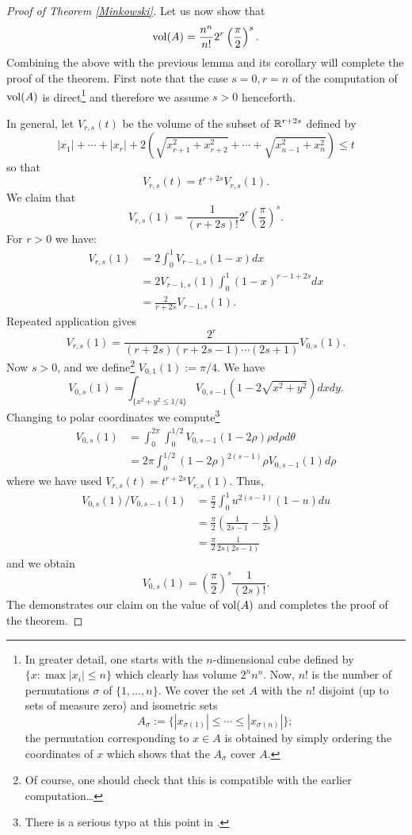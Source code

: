 \documentclass[10pt,a4paper,reqno]{amsart}
\begin{document}
\begin{proof}[Proof of Theorem \ref{Minkowski}]
Let us now show that \[\mathrm{vol}(A) = \frac{n^n}{n!} 2^r \left(
\frac{\pi}{2}\right)^s.\] Combining the above with the previous lemma and its
corollary will complete the proof of the theorem. First note that the case
$s=0, r=n$ of the computation of $\mathrm{vol}(A)$ is direct\footnote{In greater
detail, one starts with the $n$-dimensional cube defined by $\{x : \max |x_i|
\le n\}$ which clearly has volume $2^n n^n$. Now, $n!$ is the number of
permutations $\sigma$ of $\{1,\dots,n\}$. We cover the set $A$ with the $n!$
disjoint (up to sets of measure zero) and isometric sets \[A_\sigma :=
\{|x_{\sigma(1)}| \le \cdots \le |x_{\sigma(n)}| \};\] the permutation
corresponding to $x\in A$ is obtained by simply ordering the coordinates of
$x$ which shows that the $A_\sigma$ cover $A$.} and therefore we assume $s>0$
henceforth.

In general, let $V_{r,s}(t)$ be the volume of the subset of $\mathbb{R}^{r+2s}$ defined
by \[ |x_1| + \cdots + |x_r| + 2\left( \sqrt{x_{r+1}^2+x_{r+2}^2} + \cdots +
\sqrt{x_{n-1}^2+x_{n}^2} \right) \le t\] so that \[V_{r,s}(t) =
t^{r+2s}V_{r,s}(1).\] We claim that \[V_{r,s}(1) = \frac{1}{(r+2s)!} 2^r\left(
\frac{\pi}{2} \right)^s.\] For $r > 0$ we have:
\begin{align*}
  V_{r,s}(1) &= 2\int_0^1 V_{r-1,s}(1-x)dx\\
  &= 2V_{r-1,s}(1)\int_0^1 (1-x)^{r-1+2s}dx \\
  &= \frac{2}{r+2s}V_{r-1,s}(1).
\end{align*} Repeated application gives \[V_{r,s}(1) =
\frac{2^r}{(r+2s)(r+2s-1)\cdots (2s+1)} V_{0,s}(1).\] Now $s> 0$, and we
define\footnote{Of course, one should check that this is compatible with the
earlier computation\ldots} $V_{0,1}(1) := \pi/4$. We have \[V_{0,s}(1) =
\int_{\{x^2+y^2 \le 1/4\}} V_{0,s-1}\left( 1-2\sqrt{x^2+y^2}\right) dx dy.\]
Changing to polar coordinates we compute\footnote{There is a serious typo at
this point in \cite{M}.}
\begin{align*}
  V_{0,s}(1) &= \int_0^{2\pi} \int_0^{1/2} V_{0,s-1}(1-2\rho)
  \rho d\rho d\theta \\
  &= 2\pi \int_0^{1/2} (1-2\rho)^{2(s-1)}\rho V_{0,s-1}(1) d\rho
\end{align*} where we have used \(V_{r,s}(t) =
t^{r+2s}V_{r,s}(1).\) Thus, \begin{align*}
  V_{0,s}(1)/V_{0,s-1}(1) &= \frac{\pi}{2}\int_0^1 u^{2(s-1)}(1-u)du \\
  &= \frac{\pi}{2}\left( \frac{1}{2s-1} - \frac{1}{2s} \right)\\
  &= \frac{\pi}{2} \frac{1}{2s(2s-1)}
\end{align*}
and we obtain \[V_{0,s}(1) = \left( \frac{\pi}{2} \right)^{s}
\frac{1}{(2s)!}.\] The demonstrates our claim on the value of $\mathrm{vol}(A)$ and
completes the proof of the theorem. \end{proof}
\end{document}

